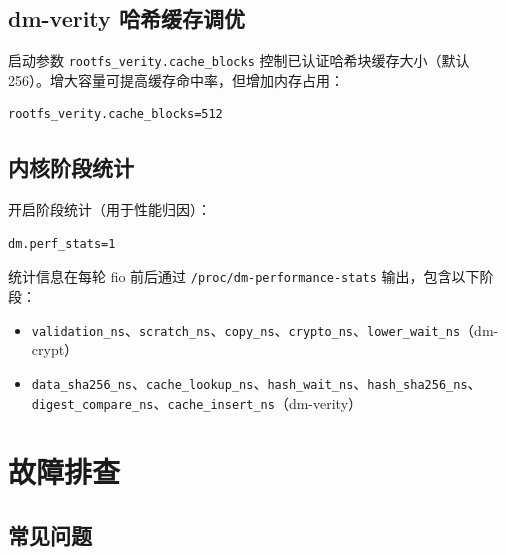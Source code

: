 \subsection{dm-verity 哈希缓存调优}

启动参数 \texttt{rootfs\_\allowbreak verity.cache\_\allowbreak blocks} 控制已认证哈希块缓存大小（默认 256）。增大容量可提高缓存命中率，但增加内存占用：
\begin{lstlisting}[basicstyle=\ttfamily\small, breaklines=true]
rootfs_verity.cache_blocks=512
\end{lstlisting}

\subsection{内核阶段统计}

开启阶段统计（用于性能归因）：
\begin{lstlisting}[basicstyle=\ttfamily\small, breaklines=true]
dm.perf_stats=1
\end{lstlisting}

统计信息在每轮 fio 前后通过 \texttt{/proc/\allowbreak dm-\allowbreak performance-\allowbreak stats} 输出，包含以下阶段：
\begin{sloppypar}
\begin{itemize}
    \item \texttt{validation\_\allowbreak ns}、\allowbreak\texttt{scratch\_\allowbreak ns}、\allowbreak\texttt{copy\_\allowbreak ns}、\allowbreak\texttt{crypto\_\allowbreak ns}、\allowbreak\texttt{lower\_\allowbreak wait\_\allowbreak ns}（dm-crypt）
    \item \texttt{data\_\allowbreak sha256\_\allowbreak ns}、\allowbreak\texttt{cache\_\allowbreak lookup\_\allowbreak ns}、\allowbreak\texttt{hash\_\allowbreak wait\_\allowbreak ns}、\allowbreak\texttt{hash\_\allowbreak sha256\_\allowbreak ns}、\allowbreak\texttt{digest\_\allowbreak compare\_\allowbreak ns}、\allowbreak\texttt{cache\_\allowbreak insert\_\allowbreak ns}（dm-verity）
\end{itemize}
\end{sloppypar}

\section{故障排查}

\subsection{常见问题}

